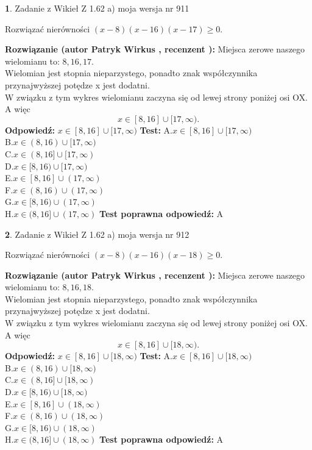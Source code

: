 \documentclass[12pt, a4paper]{article}
\theoremstyle{definition} %
\newtheorem{zad}{}
\newcommand{\zadStart}[1]{\begin{zad}#1\newline}
\newcommand{\zadStop}{\end{zad}}
\newcommand{\rozwStart}[2]{\noindent \textbf{Rozwiązanie (autor #1 , recenzent #2): }\newline}
\newcommand{\rozwStop}{\newline}
\newcommand{\odpStart}{\noindent \textbf{Odpowiedź:}\newline}
\newcommand{\odpStop}{\newline}
\newcommand{\testStart}{\noindent \textbf{Test:}\newline}
\newcommand{\testStop}{\newline}
\newcommand{\kluczStart}{\noindent \textbf{Test poprawna odpowiedź:}\newline}
\newcommand{\kluczStop}{\newline}
\begin{document}
\zadStart{Zadanie z Wikieł Z 1.62 a) moja wersja nr 911}

Rozwiązać nierówności $(x-8)(x-16)(x-17)\ge0$.
\zadStop
\rozwStart{Patryk Wirkus}{}
Miejsca zerowe naszego wielomianu to: $8, 16, 17$.\\
Wielomian jest stopnia nieparzystego, ponadto znak współczynnika przy\linebreak najwyższej potędze x jest dodatni.\\ W związku z tym wykres wielomianu zaczyna się od lewej strony poniżej osi OX. A więc $$x \in [8,16] \cup [17,\infty).$$
\rozwStop
\odpStart
$x \in [8,16] \cup [17,\infty)$
\odpStop
\testStart
A.$x \in [8,16] \cup [17,\infty)$\\
B.$x \in (8,16) \cup [17,\infty)$\\
C.$x \in (8,16] \cup [17,\infty)$\\
D.$x \in [8,16) \cup [17,\infty)$\\
E.$x \in [8,16] \cup (17,\infty)$\\
F.$x \in (8,16) \cup (17,\infty)$\\
G.$x \in [8,16) \cup (17,\infty)$\\
H.$x \in (8,16] \cup (17,\infty)$
\testStop
\kluczStart
A
\kluczStop



\zadStart{Zadanie z Wikieł Z 1.62 a) moja wersja nr 912}

Rozwiązać nierówności $(x-8)(x-16)(x-18)\ge0$.
\zadStop
\rozwStart{Patryk Wirkus}{}
Miejsca zerowe naszego wielomianu to: $8, 16, 18$.\\
Wielomian jest stopnia nieparzystego, ponadto znak współczynnika przy\linebreak najwyższej potędze x jest dodatni.\\ W związku z tym wykres wielomianu zaczyna się od lewej strony poniżej osi OX. A więc $$x \in [8,16] \cup [18,\infty).$$
\rozwStop
\odpStart
$x \in [8,16] \cup [18,\infty)$
\odpStop
\testStart
A.$x \in [8,16] \cup [18,\infty)$\\
B.$x \in (8,16) \cup [18,\infty)$\\
C.$x \in (8,16] \cup [18,\infty)$\\
D.$x \in [8,16) \cup [18,\infty)$\\
E.$x \in [8,16] \cup (18,\infty)$\\
F.$x \in (8,16) \cup (18,\infty)$\\
G.$x \in [8,16) \cup (18,\infty)$\\
H.$x \in (8,16] \cup (18,\infty)$
\testStop
\kluczStart
A
\kluczStop
\end{document}
